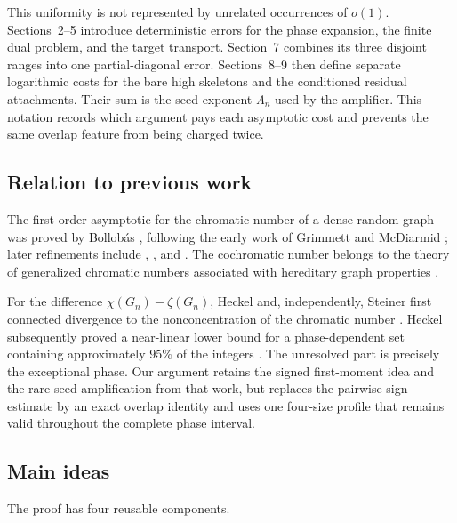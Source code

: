 This uniformity is not represented by unrelated occurrences of $o(1)$.
Sections~2--5 introduce deterministic errors for the phase expansion, the
finite dual problem, and the target transport. Section~7 combines its three
disjoint ranges into one partial-diagonal error. Sections~8--9 then define
separate logarithmic costs for the bare high skeletons and the conditioned
residual attachments. Their sum is the seed exponent $\Lambda_n$ used by the
amplifier. This notation records which argument pays each asymptotic cost and
prevents the same overlap feature from being charged twice.

\subsection*{Relation to previous work}

The first-order asymptotic for the chromatic number of a dense random graph was
proved by Bollob\'as \citep{bollobas-1988}, following the early work of
Grimmett and McDiarmid \citep{grimmett-mcdiarmid-1975}; later refinements
include \citet{mcdiarmid-1990}, \citet{panagiotou-steger-2009}, and
\citet{heckel-2018}. The cochromatic number belongs to the theory of generalized
chromatic numbers associated with hereditary graph properties
\citep{scheinerman-1992,bollobas-thomason-1995}.

For the difference $\chi(G_n)-\zeta(G_n)$, Heckel and, independently, Steiner
first connected divergence to the nonconcentration of the chromatic number
\citep{heckel-2024-question,steiner-2024}. Heckel subsequently proved a
near-linear lower bound for a phase-dependent set containing approximately
$95\%$ of the integers \citep{heckel-2025-difference}. The unresolved part is
precisely the exceptional phase. Our argument retains the signed first-moment
idea and the rare-seed amplification from that work, but replaces the pairwise
sign estimate by an exact overlap identity and uses one four-size profile that
remains valid throughout the complete phase interval.

\subsection*{Main ideas}

The proof has four reusable components.

